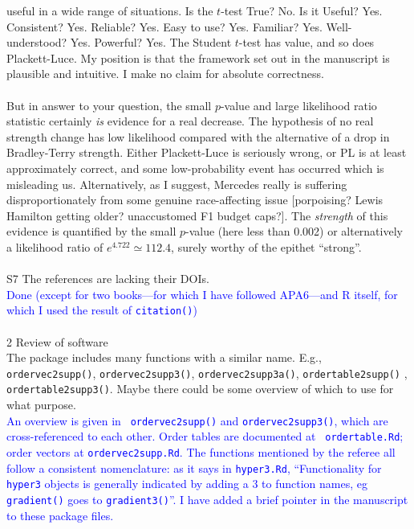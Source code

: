 \documentclass[12pt]{article}
\begin{document}
{  useful in a wide range of situations.  Is the $t$-test True?  No.
  Is it Useful?  Yes.  Consistent?  Yes.  Reliable?  Yes.  Easy to
  use?  Yes.  Familiar?  Yes.  Well-understood?  Yes.  Powerful?  Yes.
  The Student $t$-test has value, and so does Plackett-Luce.  My
  position is that the framework set out in the manuscript is
  plausible and intuitive.  I make no claim for absolute
  correctness.\\ \\ But in answer to your question, the small
  $p$-value and large likelihood ratio statistic certainly {\em is}
  evidence for a real decrease.  The hypothesis of no real strength
  change has low likelihood compared with the alternative of a drop in
  Bradley-Terry strength.  Either Plackett-Luce is seriously wrong, or
  PL is at least approximately correct, and some low-probability event
  has occurred which is misleading us.  Alternatively, as I suggest,
  Mercedes really is suffering disproportionately from some genuine
  race-affecting issue [porpoising? Lewis Hamilton getting older?
    unaccustomed F1 budget caps?].  The {\em strength} of this
  evidence is quantified by the small $p$-value (here less than 0.002)
  or alternatively a likelihood ratio of $e^{4.722}\simeq 112.4$,
  surely worthy of the epithet ``strong''.}\\ \\

S7 The references are lacking their DOIs.\\ \textcolor{blue}{Done
  (except for two books---for which I have followed APA6---and R
  itself, for which I used the result of {\tt citation()})} \\ \\

2 Review of software\\

The package includes many functions with a similar name. E.g., {\tt
  ordervec2supp()}, {\tt ordervec2supp3()}, {\tt ordervec2supp3a()},
{\tt ordertable2supp()} , {\tt ordertable2supp3()}. Maybe there could
be some overview of which to use for what
purpose.\\ \textcolor{blue}{An overview is given in {\tt
    ordervec2supp()} and {\tt ordervec2supp3()}, which are
  cross-referenced to each other.  Order tables are documented at {\tt
    ordertable.Rd}; order vectors at {\tt ordervec2supp.Rd}.  The
  functions mentioned by the referee all follow a consistent
  nomenclature: as it says in {\tt hyper3.Rd}, ``Functionality for
  {\tt hyper3} objects is generally indicated by adding a 3 to
  function names, eg {\tt gradient()} goes to {\tt gradient3()}''.  I
  have added a brief pointer in the manuscript to these package
  files.}
\end{document}
